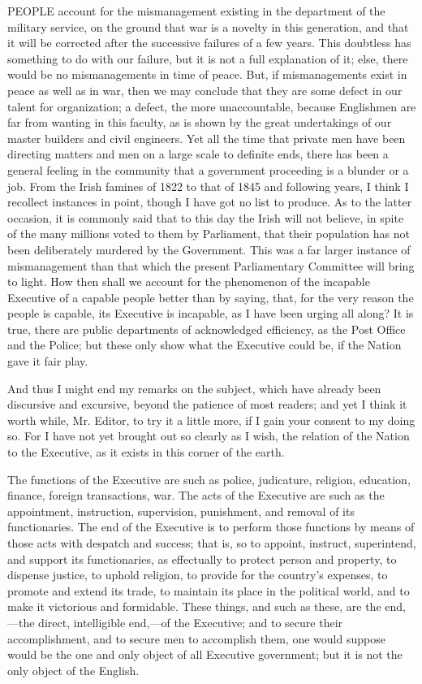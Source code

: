 PEOPLE
account for the mismanagement existing in the department of the
military service, on the ground that war is a novelty in this
generation, and that it will be corrected after the successive
failures of a few years. This doubtless has something to do with our
failure, but it is not a full explanation of it; else, there would be
no mismanagements in time of peace. But, if mismanagements exist in
peace as well as in war, then we may conclude that they are some
defect in our talent for organization; a defect, the more
unaccountable, because Englishmen are far from wanting in this
faculty, as is shown by the great undertakings of our master builders
and civil engineers. Yet all the time that private men have been
directing matters and men on a large scale to definite ends, there has
been a general feeling in the community that a government proceeding
is a blunder or a job. From the Irish famines of 1822 to that of 1845
and following years, I think I recollect instances in point, though I
have got no list to produce. As to the latter occasion, it is commonly
said that to this day the Irish will not believe, in spite of the many
millions voted to them by Parliament, that their population has not
been deliberately murdered by the Government. This was a far larger
instance of mismanagement than that which the present Parliamentary
Committee will bring to light. How then shall we account for the
phenomenon of the incapable Executive of a capable people better
than by saying, that, for the very reason the people is capable, its
Executive is incapable, as I have been urging all along? It is true,
there are public departments of acknowledged efficiency, as the Post
Office and the Police; but these only show what the Executive could
be, if the Nation gave it fair play.

And thus I might end my remarks on the subject,
which have already been discursive and excursive, beyond the patience
of most readers; and yet I think it worth while, Mr. Editor, to try it
a little more, if I gain your consent to my doing so. For I have not
yet brought out so clearly as I wish, the relation of the Nation to
the Executive, as it exists in this corner of the earth.

The functions of the Executive are such as
police, judicature, religion, education, finance, foreign
transactions, war. The acts of the Executive are such as the
appointment, instruction, supervision, punishment, and removal of its
functionaries. The end of the Executive is to perform those functions
by means of those acts with despatch and success; that is, so to
appoint, instruct, superintend, and support its functionaries, as
effectually to protect person and property, to dispense justice, to
uphold religion, to provide for the country's expenses, to promote and
extend its trade, to maintain its place in the political world, and to
make it victorious and formidable. These things, and such as these,
are the end,—the direct, intelligible end,—of the Executive; and
to secure their accomplishment, and to secure men to accomplish them,
one would suppose would be the one and only object of all Executive
government; but it is not the only object of the English.

